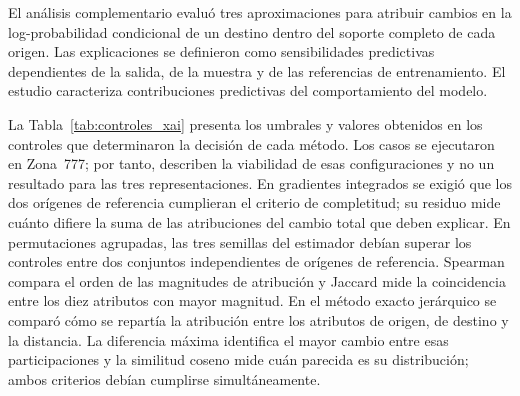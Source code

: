 El análisis complementario evaluó tres aproximaciones para atribuir cambios en la log-probabilidad condicional de un destino dentro del soporte completo de cada origen. Las explicaciones se definieron como sensibilidades predictivas dependientes de la salida, de la muestra y de las referencias de entrenamiento. El estudio caracteriza contribuciones predictivas del comportamiento del modelo.

La Tabla~\ref{tab:controles_xai} presenta los umbrales y valores obtenidos en los controles que determinaron la decisión de cada método. Los casos se ejecutaron en Zona~777; por tanto, describen la viabilidad de esas configuraciones y no un resultado para las tres representaciones. En gradientes integrados se exigió que los dos orígenes de referencia cumplieran el criterio de completitud; su residuo mide cuánto difiere la suma de las atribuciones del cambio total que deben explicar. En permutaciones agrupadas, las tres semillas del estimador debían superar los controles entre dos conjuntos independientes de orígenes de referencia. Spearman compara el orden de las magnitudes de atribución y Jaccard mide la coincidencia entre los diez atributos con mayor magnitud. En el método exacto jerárquico se comparó cómo se repartía la atribución entre los atributos de origen, de destino y la distancia. La diferencia máxima identifica el mayor cambio entre esas participaciones y la similitud coseno mide cuán parecida es su distribución; ambos criterios debían cumplirse simultáneamente.


